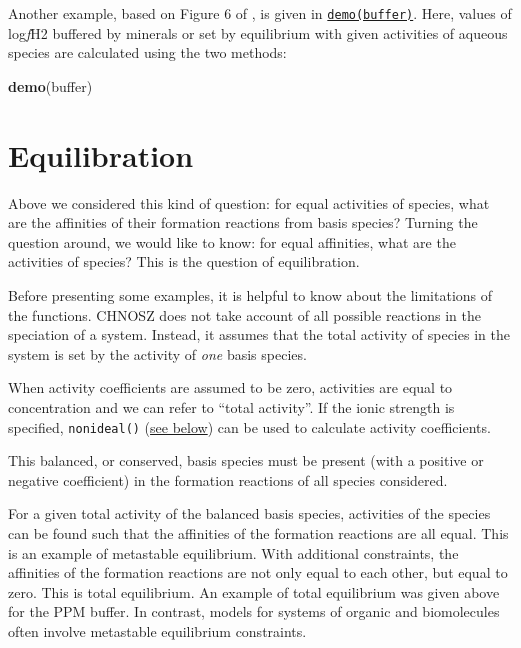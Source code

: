 \documentclass[]{tufte-handout}
\newenvironment{Shaded}{}{}
\newcommand{\KeywordTok}[1]{\textcolor[rgb]{0.00,0.44,0.13}{\textbf{#1}}}
\newcommand{\NormalTok}[1]{#1}
\begin{document}
Another example, based on Figure 6 of \citet{SS95}, is given in
\href{../demo}{{\texttt{demo(buffer)}}}. Here, values of log\emph{f}H2
buffered by minerals or set by equilibrium with given activities of
aqueous species are calculated using the two methods:

\begin{Shaded}
\begin{Highlighting}[]
\KeywordTok{demo}\NormalTok{(buffer)}
\end{Highlighting}
\end{Shaded}

\hypertarget{equilibration}{\section{Equilibration}\label{equilibration}}

Above we considered this kind of question: for equal activities of
species, what are the affinities of their formation reactions from basis
species? Turning the question around, we would like to know: for equal
affinities, what are the activities of species? This is the question of
equilibration.

Before presenting some examples, it is helpful to know about the
limitations of the functions. CHNOSZ does not take account of all
possible reactions in the speciation of a system. Instead, it assumes
that the total activity of species in the system is set by the activity
of \emph{one} basis species.

\begin{marginfigure}
When activity coefficients are assumed to be zero, activities are equal
to concentration and we can refer to ``total activity''. If the ionic
strength is specified, {\texttt{nonideal()}}
(\protect\hyperlink{activity-coefficients}{see below}) can be used to
calculate activity coefficients.
\end{marginfigure}

This balanced, or conserved, basis species must be present (with a
positive or negative coefficient) in the formation reactions of all
species considered.

For a given total activity of the balanced basis species, activities of
the species can be found such that the affinities of the formation
reactions are all equal. This is an example of metastable equilibrium.
With additional constraints, the affinities of the formation reactions
are not only equal to each other, but equal to zero. This is total
equilibrium. An example of total equilibrium was given above for the PPM
buffer. In contrast, models for systems of organic and biomolecules
often involve metastable equilibrium constraints.
\end{document}
